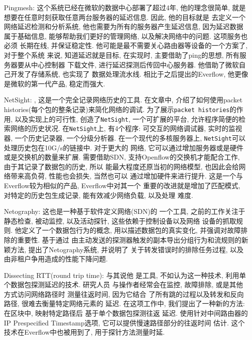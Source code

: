 {\begin{mdframed}[everyline=true]
Pingmesh: 
这个系统已经在微软的数据中心部署了超过4年, 他的理念很简单,
就是想要在任意时刻获取任意两台服务器的延迟信息. 因此, 他的目标就是
去定义一个网络延迟检测和分析系统, 他也需要为所有的服务器产生延迟信息,
因为延迟数据 属于基础信息, 能够帮助我们更好的管理网络,
以及解决网络中的问题. 这项服务也必须 长期在线, 并保证稳定性.
他可能是最不需要关心路由器等设备的一个方案了, 对于整个系统 来说,
知道延迟就是目标, 在实现时, 主要借助了ping的思想,
所有服务器要从中心控制器 下载文件, 进行延迟探测后传回中心服务器.
他借助了微软自己开发了存储系统, 也实现了 数据处理流水线.
相比于之后提出的Everflow, 他更像是微软的第一代产品, 稳定而强大.

NetSight: , 这是一个完全记录网络历史的工具.
在文章中, 介绍了如何使用packet
histories(每个包的整条记录)来简化网络的调试.
为了展示\texttt{packet\ histories}的作用, 以及实现上的可行性,
创造了\texttt{NetSight}, 一个可扩展的平台,
允许程序简便的检索网络的历史状况. 在\texttt{NetSight}上, 有4个程序:
可交互的网络调试器, 实时的监视器, 一个历史记录器, 一个分级分析器.
在一个现代的多核服务器上,
\texttt{NetSight}可以处理历史包在10G/s的链接中. 对于更大的 网络,
它可以通过增加服务器或是硬件 或是交换机的数量来扩展. 需要借助SDN,
支持Openflow的交换机才能配合工作, 由于其记录了数据包的历史, 所以
能最大程度还原当初的网络模型, 也因此会给网络带来高负荷, 性能也会损失,
当然也可以 通过增加硬件来进行提升. 这是一个与Everflow较为相似的产品,
Everflow中对其一个 重要的改进就是增加了匹配模式, 对特定的历史包生成记录,
能有效减少网络负载, 以及处理 难度.

Netography:  这也是一种基于软件定义网络(SDN)的
一个工具, 之前的工作关注于静态检查, 被动监控, 以及活动探针,
这些依赖于控制设备以及网络 设备的抓取规则. 他定义了一个数据包行为的概念,
用以描述数据包的真实变化, 并强调对故障排除的重要性. 基于通过
由主动发送的探测器触发的副本导出分组行为和流规则的新颖方法,
提出了Netography系统, 并说明了 关于转发错误时的排除任务过程,
以及由非租户争用造成的性能下降问题.

Dissecting RTT(round trip time):  与其说他
是工具, 不如认为这一种技术, 利用单个数据包探测延迟的技术. 研究人员
与操作者经常会在监控, 故障排除, 或是其他方式访问网络路径时 测量往返时间,
因为它结合 了所有跳的过程以及转发和反向路径, 很难去衡量特定网络元素的
延迟. 在这项工作中, 我们提出了一种新的方法: 在区块中, 映射特定路径后
基于单个数据包探测往返 延迟. 使用针对中间路由器的IP Prespecified
Timestamp选项, 它可以提供慢速路径部分的往返时间 估计.
这个技术在Everflow中也被用到了, 用于探针方法测量时延.


\end{mdframed}}
